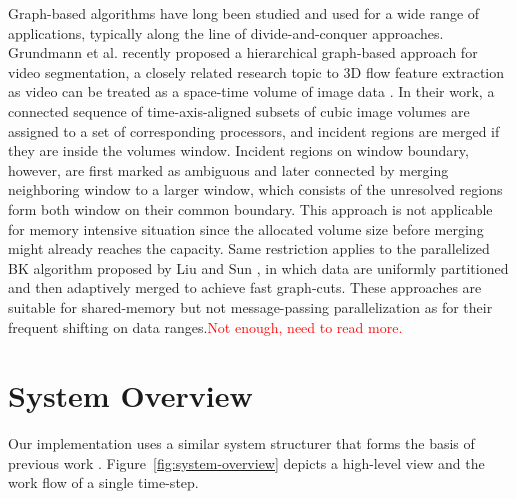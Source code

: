 \documentclass[10pt, conference, compsocconf]{IEEEtran}
\begin{document}
Graph-based algorithms have long been studied and used for a wide range of applications, typically along the line of divide-and-conquer approaches.
Grundmann et al. \cite{Grundmann2010} recently proposed a hierarchical graph-based approach for video segmentation, a closely related research topic to 3D flow feature extraction as video can be treated as a space-time volume of image data \cite{Klein2002}. In their work, a connected sequence of time-axis-aligned subsets of cubic image volumes are assigned to a set of corresponding processors, and incident regions are merged if they are inside the volumes window. Incident regions on window boundary, however, are first marked as ambiguous and later connected by merging neighboring window to a larger window, which consists of the unresolved regions form both window on their common boundary. This approach is not applicable for memory intensive situation since the allocated volume size before merging might already reaches the capacity. Same restriction applies to the parallelized BK algorithm \cite{Boykov2004} proposed by Liu and Sun \cite{Liu2010}, in which data are uniformly partitioned and then adaptively merged to achieve fast graph-cuts. These approaches are suitable for shared-memory but not message-passing parallelization as for their frequent shifting on data ranges.\textcolor{red}{Not enough, need to read more.}

\section{System Overview}
Our implementation uses a similar system structurer that forms the basis of previous work \cite{Muelder2009}. Figure~\ref{fig:system-overview} depicts a high-level view and the work flow of a single time-step. 
\end{document}

